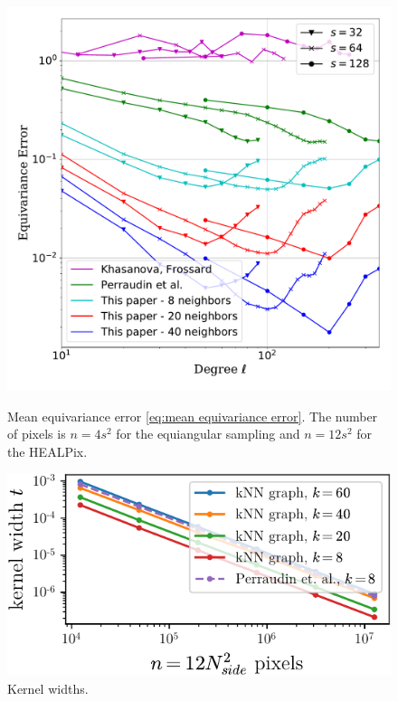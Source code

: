 \documentclass{article} %
\begin{document}
\begin{figure}
	\begin{minipage}{0.6\linewidth}
		\centering
		\includegraphics[width=1\linewidth]{all_in_one.pdf}
		\caption{
			Mean equivariance error \eqref{eq:mean equivariance error}.
			The number of pixels is $n = 4 s^2$ for the equiangular sampling and $n = 12 s^2$ for the HEALPix.
		}
		\label{fig:equivariance_error}
	\end{minipage}
	\hfill
	\begin{minipage}{0.35\linewidth}
		\centering
		\includegraphics[width=\linewidth]{kernel_widths}
		\caption{Kernel widths.}
		\label{fig:kernel_widths}
		\vspace{1em}

\end{minipage}
\end{figure}
\end{document}
